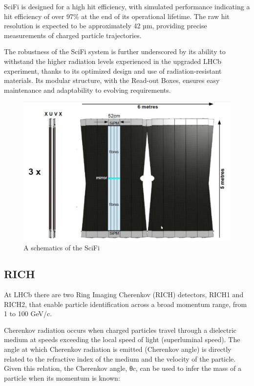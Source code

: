 SciFi is designed for a high hit efficiency, with simulated performance indicating a hit efficiency of over 97\% at the end of its operational lifetime. The raw hit resolution is expected to be approximately 42 µm, providing precise measurements of charged particle trajectories.

The robustness of the SciFi system is further underscored by its ability to withstand the higher radiation levels experienced in the upgraded LHCb experiment, thanks to its optimized design and use of radiation-resistant materials. Its modular structure, with the Read-out Boxes, ensures easy maintenance and adaptability to evolving requirements.

\begin{figure}
    \centering
    \includegraphics[width=\textwidth]{figures/scifi.png}
    \caption{A schematics of the SciFi}
    \label{fig:scifi}
\end{figure}


\subsection{RICH}
At LHCb there are two Ring Imaging Cherenkov (RICH) detectors, RICH1 and RICH2, that enable particle identification\cite{LHCb:2013urp} across a broad momentum range, from 1 to 100 GeV/c\cite{Adinolfi_2013}.

Cherenkov radiation occurs when charged particles travel through a dielectric medium at speeds exceeding the local speed of light (superluminal speed). The angle at which Cherenkov radiation is emitted (Cherenkov angle) is directly related to the refractive index of the medium and the velocity of the particle. Given this relation, the Cherenkov angle, θc, can be used to infer the mass of a particle when its momentum is known:


